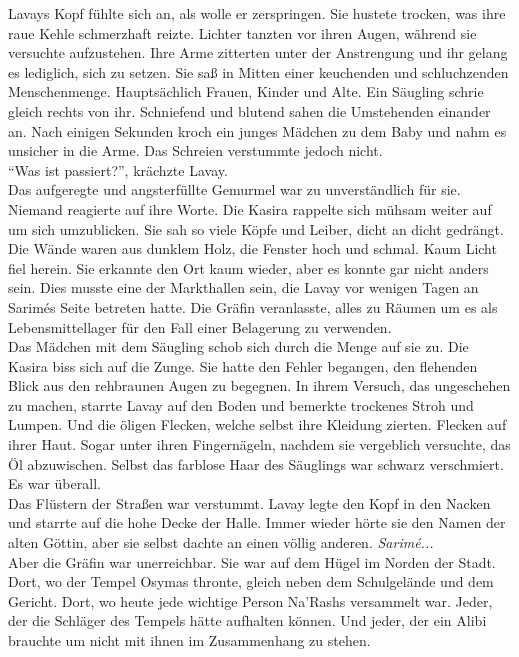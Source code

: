 Lavays Kopf fühlte sich an, als wolle er zerspringen. Sie hustete trocken, was ihre raue Kehle 
schmerzhaft reizte. Lichter tanzten vor ihren Augen, während sie versuchte aufzustehen. Ihre 
Arme zitterten unter der Anstrengung und ihr gelang es lediglich, sich zu setzen. Sie saß in Mitten 
einer keuchenden und schluchzenden Menschenmenge. Hauptsächlich Frauen, Kinder und Alte. Ein 
Säugling schrie gleich rechts von ihr. Schniefend und blutend sahen die Umstehenden einander an. 
Nach einigen Sekunden kroch ein junges Mädchen zu dem Baby und nahm es unsicher in die Arme. Das 
Schreien verstummte jedoch nicht.\\
``Was ist passiert?'', krächzte Lavay.\\
Das aufgeregte und angsterfüllte Gemurmel war zu unverständlich für sie. Niemand reagierte auf ihre 
Worte. Die Kasira rappelte sich mühsam weiter auf um sich umzublicken. Sie sah so viele Köpfe 
und Leiber, dicht an dicht gedrängt. Die Wände waren aus dunklem Holz, die Fenster hoch und 
schmal. Kaum Licht fiel herein. Sie erkannte den Ort kaum wieder, aber es konnte gar nicht 
anders sein. Dies musste eine der Markthallen sein, die Lavay vor wenigen Tagen an Sarimés 
Seite betreten hatte. Die Gräfin veranlasste, alles zu Räumen um es als Lebensmittellager für 
den Fall einer Belagerung zu verwenden.\\
Das Mädchen mit dem Säugling schob sich durch die Menge auf sie zu. Die Kasira biss sich auf 
die Zunge. Sie hatte den Fehler begangen, den flehenden Blick aus den rehbraunen Augen zu 
begegnen. In ihrem Versuch, das ungeschehen zu machen, starrte Lavay auf den Boden und bemerkte 
trockenes Stroh und Lumpen. Und die öligen Flecken, welche selbst ihre Kleidung zierten. Flecken 
auf ihrer Haut. Sogar unter ihren Fingernägeln, nachdem sie vergeblich versuchte, das Öl 
abzuwischen. Selbst das farblose Haar des Säuglings war schwarz verschmiert. Es war überall.\\
Das Flüstern der Straßen war verstummt. Lavay legte den Kopf in den Nacken und starrte auf die hohe 
Decke der Halle. Immer wieder hörte sie den Namen der alten Göttin, aber sie selbst dachte an einen 
völlig anderen. \textit{Sarimé...}\\
Aber die Gräfin war unerreichbar. Sie war auf dem Hügel im Norden der Stadt. Dort, wo der Tempel 
Osymas thronte, gleich neben dem Schulgelände und dem Gericht. Dort, wo heute jede wichtige Person 
Na'Rashs versammelt war. Jeder, der die Schläger des Tempels hätte aufhalten können. Und jeder, der 
ein Alibi brauchte um nicht mit ihnen im Zusammenhang zu stehen.\\
